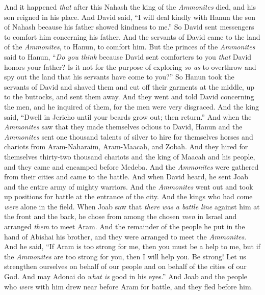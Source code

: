 \begin{biblechapter} %
 And it happened \textit{that} after this Nahash the king of the \textit{Ammonites} died, and his son reigned in his place.
\verse And David said, “I will deal kindly with Hanun the son of Nahash because his father showed kindness to me.” So David sent messengers to comfort him concerning his father. And the servants of David came to the land of the \textit{Ammonites}, to Hanun, to comfort him.
\verse But the princes of the \textit{Ammonites} said to Hanun, “\textit{Do you think} because David sent comforters to you \textit{that} David honors your father? Is it not for the purpose of exploring \textit{so as} to overthrow and spy out the land that his servants have come to you?”
\verse So Hanun took the servants of David and shaved them and cut off their garments at the middle, up to the buttocks, and sent them away.
\verse And they went and told David concerning the men, and he inquired of them, for the men were very disgraced. And the king said, “Dwell in Jericho until your beards grow out; then return.”
\verse And when the \textit{Ammonites} saw that they made themselves odious to David, Hanun and the \textit{Ammonites} sent one thousand talents of silver to hire for themselves horses and chariots from Aram-Naharaim, Aram-Maacah, and Zobah.
\verse And they hired for themselves thirty-two thousand chariots and the king of Maacah and his people, and they came and encamped before Medeba. And the \textit{Ammonites} were gathered from their cities and came to the battle.
\verse And when David heard, he sent Joab and the entire army of mighty warriors.
\verse And the \textit{Ammonites} went out and took up positions for battle at the entrance of the city. And the kings who had come \textit{were} alone in the field.
\verse When Joab saw that \textit{there was} \textit{a battle line} against him at the front and the back, he chose from among the chosen \textit{men} in Israel and arranged \textit{them} to meet Aram.
\verse And the remainder of the people he put in the hand of Abishai his brother, and they were arranged to meet the \textit{Ammonites}.
\verse And he said, “If Aram is too strong for me, then you must be a help to me, but if the \textit{Ammonites} are too strong for you, then I will help you.
\verse Be strong! Let us strengthen ourselves on behalf of our people and on behalf of the cities of our God. And may Adonai do \textit{what is} good in his eyes.”
\verse And Joab and the people who \textit{were} with him drew near before Aram for battle, and they fled before him.

\end{biblechapter}
